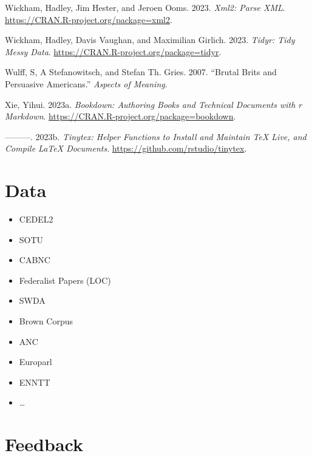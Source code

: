 \documentclass[
  letterpaper,
  DIV=11,
  numbers=noendperiod]{scrreport}
\providecommand{\tightlist}{%
  \setlength{\itemsep}{0pt}\setlength{\parskip}{0pt}}\usepackage{longtable,booktabs,array}
\newlength{\cslhangindent}
\newlength{\cslentryspacingunit} %
\newenvironment{CSLReferences}[2] %
 {%
  \setlength{\parindent}{0pt}
  \ifodd #1
  \let\oldpar\par
  \def\par{\hangindent=\cslhangindent\oldpar}
  \fi
  \setlength{\parskip}{#2\cslentryspacingunit}
 }%
 {}
\theoremstyle{definition}
\theoremstyle{remark}
\begin{document}
\begin{CSLReferences}{1}{0}
\leavevmode{}%
Wickham, Hadley, Jim Hester, and Jeroen Ooms. 2023. \emph{Xml2: Parse
XML}. \url{https://CRAN.R-project.org/package=xml2}.

\leavevmode{}%
Wickham, Hadley, Davis Vaughan, and Maximilian Girlich. 2023.
\emph{Tidyr: Tidy Messy Data}.
\url{https://CRAN.R-project.org/package=tidyr}.

\leavevmode{}%
Wulff, S, A Stefanowitsch, and Stefan Th. Gries. 2007. {``Brutal Brits
and Persuasive Americans.''} \emph{Aspects of Meaning}.

\leavevmode{}%
Xie, Yihui. 2023a. \emph{Bookdown: Authoring Books and Technical
Documents with r Markdown}.
\url{https://CRAN.R-project.org/package=bookdown}.

\leavevmode{}%
---------. 2023b. \emph{Tinytex: Helper Functions to Install and
Maintain TeX Live, and Compile LaTeX Documents}.
\url{https://github.com/rstudio/tinytex}.

\end{CSLReferences}

\cleardoublepage
{}
{}
\appendix

\hypertarget{data-appendix}{%
\chapter{Data}\label{data-appendix}}

\begin{itemize}
\tightlist
\item
  CEDEL2
\item
  SOTU
\item
  CABNC
\item
  Federalist Papers (LOC)
\item
  SWDA
\item
  Brown Corpus
\item
  ANC
\item
  Europarl
\item
  ENNTT
\item
  \ldots{}
\end{itemize}

\hypertarget{feedback-appendix}{%
\chapter{\texorpdfstring{Feedback
}{Feedback }}\label{feedback-appendix}}
\end{document}
